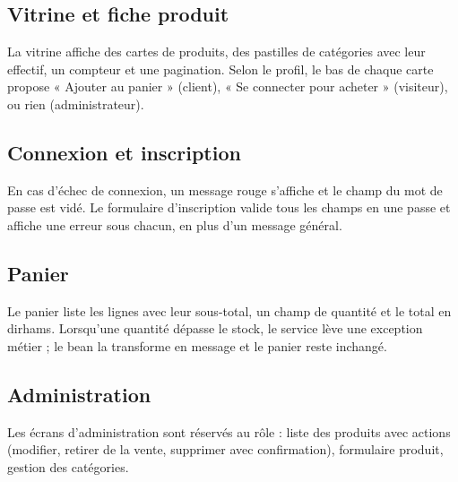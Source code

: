 \subsection{Vitrine et fiche produit}
La vitrine affiche des cartes de produits, des pastilles de catégories avec leur effectif, un compteur et une
pagination. Selon le profil, le bas de chaque carte propose « Ajouter au panier » (client), « Se connecter pour acheter »
(visiteur), ou rien (administrateur).


\subsection{Connexion et inscription}
En cas d'échec de connexion, un message rouge s'affiche et le champ du mot de passe est vidé. Le formulaire
d'inscription valide tous les champs en une passe et affiche une erreur sous chacun, en plus d'un message général.


\subsection{Panier}
Le panier liste les lignes avec leur sous-total, un champ de quantité et le total en dirhams. Lorsqu'une quantité dépasse
le stock, le service lève une exception métier ; le bean la transforme en message et le panier reste inchangé.


\subsection{Administration}
Les écrans d'administration sont réservés au rôle  : liste des produits avec actions (modifier, retirer de la
vente, supprimer avec confirmation), formulaire produit, gestion des catégories.

